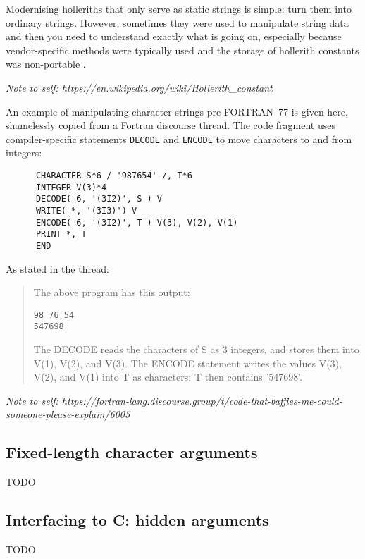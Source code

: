 Modernising holleriths that only serve as static strings is simple: turn them into ordinary
strings. However, sometimes they were used to manipulate string data and then you need
to understand exactly what is going on, especially because vendor-specific methods were
typically used and the storage of hollerith constants was non-portable \cite{hollerith}.

\emph{Note to self: https://en.wikipedia.org/wiki/Hollerith\_constant}

An example of manipulating character strings pre-FORTRAN~77 is given here, shamelessly
copied from a Fortran discourse thread. The code fragment uses compiler-specific
statements \verb+DECODE+ and \verb+ENCODE+ to move characters to and from integers:
\begin{verbatim}
      CHARACTER S*6 / '987654' /, T*6
      INTEGER V(3)*4
      DECODE( 6, '(3I2)', S ) V
      WRITE( *, '(3I3)') V
      ENCODE( 6, '(3I2)', T ) V(3), V(2), V(1)
      PRINT *, T
      END
\end{verbatim}

As stated in the thread:
\begin{quote}
The above program has this output:

\begin{verbatim}
98 76 54
547698
\end{verbatim}

The DECODE reads the characters of S as 3 integers, and stores them into V(1), V(2), and V(3).
The ENCODE statement writes the values V(3), V(2), and V(1) into T as characters; T then contains '547698'.
\end{quote}


\emph{Note to self: https://fortran-lang.discourse.group/t/code-that-baffles-me-could-someone-please-explain/6005}


\subsection{Fixed-length character arguments}
TODO


\subsection{Interfacing to C: hidden arguments}
TODO

